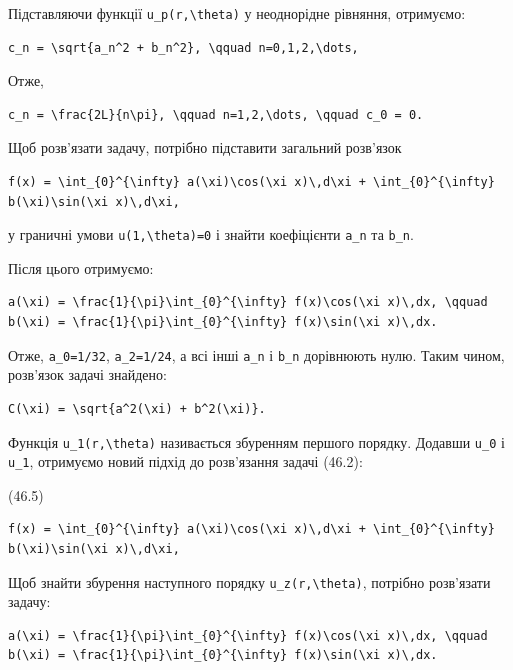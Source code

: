 \documentclass[
  ukrainian,
]{article}
\begin{document}
Підставляючи функції \texttt{u\_p(r,\textbackslash{}theta)} у
неоднорідне рівняння, отримуємо:

\begin{verbatim}
c_n = \sqrt{a_n^2 + b_n^2}, \qquad n=0,1,2,\dots,
\end{verbatim}

Отже,

\begin{verbatim}
c_n = \frac{2L}{n\pi}, \qquad n=1,2,\dots, \qquad c_0 = 0.
\end{verbatim}

Щоб розв'язати задачу, потрібно підставити загальний розв'язок

\begin{verbatim}
f(x) = \int_{0}^{\infty} a(\xi)\cos(\xi x)\,d\xi + \int_{0}^{\infty} b(\xi)\sin(\xi x)\,d\xi,
\end{verbatim}

у граничні умови \texttt{u(1,\textbackslash{}theta)=0} і знайти
коефіцієнти \texttt{a\_n} та \texttt{b\_n}.

Після цього отримуємо:

\begin{verbatim}
a(\xi) = \frac{1}{\pi}\int_{0}^{\infty} f(x)\cos(\xi x)\,dx, \qquad b(\xi) = \frac{1}{\pi}\int_{0}^{\infty} f(x)\sin(\xi x)\,dx.
\end{verbatim}

Отже, \texttt{a\_0=1/32}, \texttt{a\_2=1/24}, а всі інші \texttt{a\_n} і
\texttt{b\_n} дорівнюють нулю. Таким чином, розв'язок задачі знайдено:

\begin{verbatim}
C(\xi) = \sqrt{a^2(\xi) + b^2(\xi)}.
\end{verbatim}

Функція \texttt{u\_1(r,\textbackslash{}theta)} називається збуренням
першого порядку. Додавши \texttt{u\_0} і \texttt{u\_1}, отримуємо новий
підхід до розв'язання задачі (46.2):

(46.5)

\begin{verbatim}
f(x) = \int_{0}^{\infty} a(\xi)\cos(\xi x)\,d\xi + \int_{0}^{\infty} b(\xi)\sin(\xi x)\,d\xi,
\end{verbatim}

Щоб знайти збурення наступного порядку
\texttt{u\_z(r,\textbackslash{}theta)}, потрібно розв'язати задачу:

\begin{verbatim}
a(\xi) = \frac{1}{\pi}\int_{0}^{\infty} f(x)\cos(\xi x)\,dx, \qquad b(\xi) = \frac{1}{\pi}\int_{0}^{\infty} f(x)\sin(\xi x)\,dx.
\end{verbatim}
\end{document}
